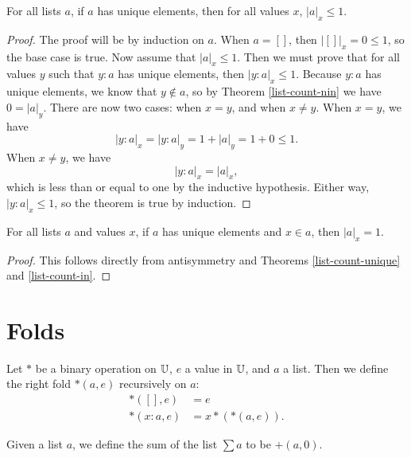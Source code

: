 \documentclass[../math.tex]{subfiles}
\begin{document}
\begin{theorem} \label{list-count-unique}
    For all lists $a$, if $a$ has unique elements, then for all values $x$,
    $|a|_x \leq 1$.
\end{theorem}
\begin{proof}
    The proof will be by induction on $a$.  When $a = []$, then $|[]|_x = 0 \leq
    1$, so the base case is true.  Now assume that $|a|_x \leq 1$.  Then we must
    prove that for all values $y$ such that $y : a$ has unique elements, then
    $|y : a|_x \leq 1$.  Because $y : a$ has unique elements, we know that $y
    \notin a$, so by Theorem \ref{list-count-nin} we have $0 = |a|_y$.  There
    are now two cases: when $x = y$, and when $x \neq y$.  When $x = y$, we have
    \[
        |y : a|_x = |y : a|_y = 1 + |a|_y = 1 + 0 \leq 1.
    \]
    When $x \neq y$, we have
    \[
        |y : a|_x = |a|_x,
    \]
    which is less than or equal to one by the inductive hypothesis.  Either way,
    $|y : a|_x \leq 1$, so the theorem is true by induction.
\end{proof}

\begin{theorem} \label{list-count-in-unique}
    For all lists $a$ and values $x$, if $a$ has unique elements and $x \in a$,
    then $|a|_x = 1$.
\end{theorem}
\begin{proof}
    This follows directly from antisymmetry and Theorems \ref{list-count-unique}
    and \ref{list-count-in}.
\end{proof}

\section{Folds}

\begin{definition}
    Let $*$ be a binary operation on $\mathbb{U}$, $e$ a value in $\mathbb{U}$, and $a$ a list.
    Then we define the right fold $*(a, e)$ recursively on $a$:
    \begin{align*}
           *([], e) &= e \\
        *(x : a, e) &= x * (*(a, e)).
    \end{align*}
\end{definition}

\begin{definition}
    Given a list $a$, we define the sum of the list $\sum a$ to be $+(a, 0)$.
\end{definition}
\end{document}
